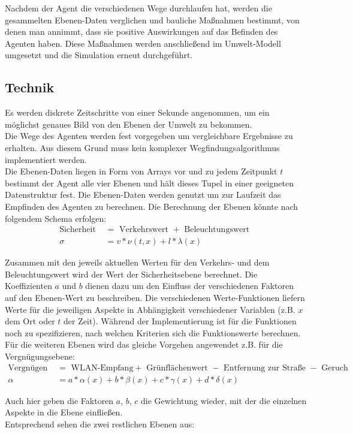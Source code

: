 \documentclass[10pt]{scrartcl}
\begin{document}
Nachdem der Agent die verschiedenen Wege durchlaufen hat, werden die gesammelten Ebenen-Daten verglichen und bauliche Maßnahmen bestimmt, von denen man annimmt, dass sie positive Auswirkungen auf das Befinden des Agenten haben. Diese Maßnahmen werden anschließend im Umwelt-Modell umgesetzt und die Simulation erneut durchgeführt.

\subsection{Technik}
Es werden diskrete Zeitschritte von einer Sekunde angenommen, um ein möglichst genaues Bild von den Ebenen der Umwelt zu bekommen.\\
Die Wege des Agenten werden fest vorgegeben um vergleichbare Ergebnisse zu erhalten. Aus diesem Grund muss kein komplexer Wegfindungsalgorithmus implementiert werden.\\
Die Ebenen-Daten liegen in Form von Arrays vor und zu jedem Zeitpunkt $t$ bestimmt der Agent alle vier Ebenen und hält dieses Tupel in einer geeigneten Datenstruktur fest. Die Ebenen-Daten werden genutzt um zur Laufzeit das Empfinden des Agenten zu berechnen.
Die Berechnung der Ebenen könnte nach folgendem Schema erfolgen:
\begin{align}
	\text{Sicherheit } &= \text{ Verkehrswert } + \text{ Beleuchtungswert }\\
	\sigma &= v * \nu(t,x) + l * \lambda(x)
\end{align}

Zusammen mit den jeweils aktuellen Werten für den Verkehrs- und dem Beleuchtungswert wird der Wert der Sicherheitsebene berechnet.
Die Koeffizienten $a$ und $b$ dienen dazu um den Einfluss der verschiedenen Faktoren auf den Ebenen-Wert zu beschreiben.
Die verschiedenen Werte-Funktionen liefern Werte für die jeweiligen Aspekte in Abhängigkeit verschiedener Variablen (z.B. $x$ dem Ort oder $t$ der Zeit).
Während der Implementierung ist für die Funktionen noch zu spezifizieren, nach welchen Kriterien sich die Funktionswerte berechnen.
Für die weiteren Ebenen wird das gleiche Vorgehen angewendet z.B. für die Vergnügungsebene:
\begin{align}
	\text{Vergnügen } &= \text{ WLAN-Empfang} + \text{ Grünflächenwert } - \text{ Entfernung zur Straße } - \text{ Geruch }\\
	\alpha &= a * \alpha(x) + b * \beta(x) + c * \gamma(x) + d * \delta(x)\
\end{align}

Auch hier geben die Faktoren $a$, $b$, $c$ die Gewichtung wieder, mit der die einzelnen Aspekte in die Ebene einfließen.\\
Entsprechend sehen die zwei restlichen Ebenen aus:
\end{document}
